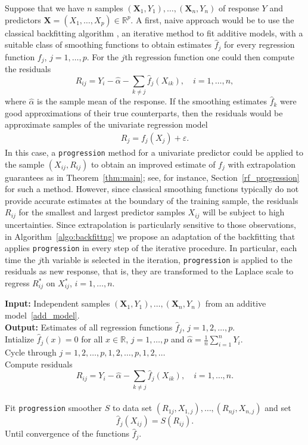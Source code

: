 \documentclass{statsoc}
\theoremstyle{break}
\def\g{\mathbf}
\newcommand{\bfX}{\mathbf X}
\begin{document}
Suppose that we have $n$ samples $(\g X_1, Y_1), \dots, (\g X_n, Y_n)$ of  response $Y$ and predictors $\g X = (X_1, \dots, X_p)\in\mathbb R^p$.
A first, naive approach would be to use the classical backfitting algorithm \citep[e.g.,][]{has1987}, an iterative method to fit additive models, with a suitable class of smoothing functions to obtain estimates $\widehat f_j$ for  every regression function $f_j$, $j=1,\dots, p$. For the $j$th regression function one could then compute the residuals 
\[R_{ij} = Y_i - \widehat \alpha - \sum_{k\neq j} \widehat f_j(X_{ik}), \quad i=1,\dots,n,\]
where $\widehat \alpha$ is the sample mean of the response.
If the smoothing estimates $\widehat f_k$ were good approximations of their true counterparts, then the residuals would be approximate samples of the univariate regression model
\begin{align}\label{uni_additive}
	R_j = f_j(X_j) + \varepsilon.
\end{align}
In this case, a \texttt{progression} method for a univariate predictor could be applied to the sample $(X_{ij},R_{ij})$ to obtain an improved estimate of $f_j$ with extrapolation guarantees as in Theorem~\ref{thm:main}; see, for instance, Section~\ref{rf_progression} for such a method. However, since classical smoothing functions typically do not provide accurate estimates at the boundary of the training sample, the residuals $R_{ij}$ for the smallest and largest predictor samples $X_{ij}$ will be subject to high uncertainties. Since extrapolation is particularly sensitive to those observations, in Algorithm~\ref{algo:backfittng} we propose an adaptation of the backfitting that applies \texttt{progression} in every step of the iterative procedure.   
In particular, each time the $j$th variable is selected in the iteration, \texttt{progression} is applied to the residuals as new response, that is, they are transformed to the Laplace scale to regress $R^*_{ij}$ on $X^*_{ij}$, $i=1,\dots, n$.


\begin{algorithm}
	\caption{ \textsc{\scriptsize BACKFITTING ALGORITHM FOR PROGRESSION} }
	{\bf Input:} Independent samples $(\bfX_1, Y_1), \dots, (\bfX_n, Y_n)$ from an additive model~\eqref{add_model}.\\
	{\bf Output:} Estimates of all regression functions $\widehat{f}_j$, $j=1,2,\dots, p$.\\
	\quad Intialize $\widehat f_j(x) = 0$ for all $x\in\mathbb R$, $j=1,\dots,p$ and $\widehat \alpha = \frac1n \sum_{i=1}^n Y_i$.\\
	\quad Cycle through $j=1,2,\dots,p,1,2, \dots, p,1,2,\dots$ \\
	\quad\quad\quad Compute residuals \[R_{ij} = Y_i - \widehat \alpha - \sum_{k\neq j} \widehat f_j(X_{ik}), \quad i=1,\dots,n.\]\\
	\quad\quad\quad Fit \texttt{progression} smoother $S$ to data set $(R_{1j}, X_{1,j}), \dots, (R_{nj}, X_{n,j})$ and set 
	\[ \widehat f_j(X_{ij}) = S(R_{ij}).\]
	\quad Until convergence of the functions $\widehat f_j$.
	 \label{algo:backfittng}
\end{algorithm}
\end{document}
